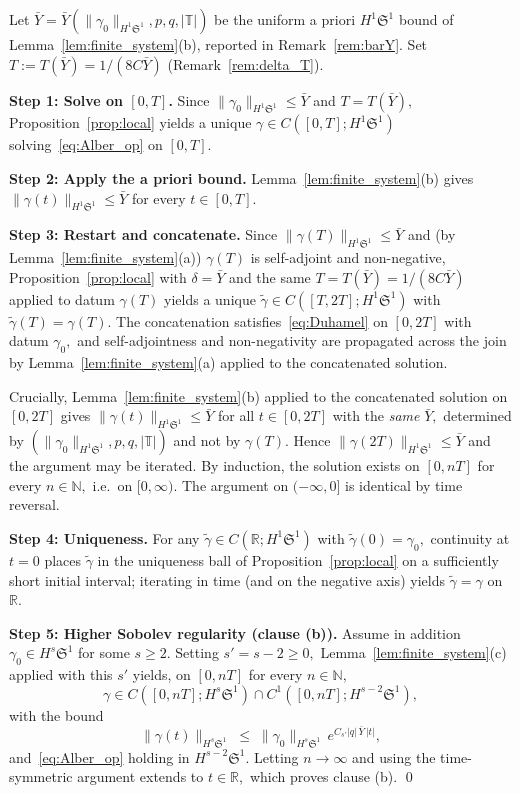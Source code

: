 \documentclass[11pt]{amsart}
\theoremstyle{definition}
\newcommand{\R}{\mathbb{R}}
\newcommand{\T}{\mathbb{T}}
\newcommand{\Sp}{\mathfrak{S}}
\begin{document}
\medskip

\noindent Let $\bar Y=\bar Y(\|\gamma_0\|_{H^1\Sp^1},p,q,|\T|)$ be the uniform a priori $H^1\Sp^1$ bound of Lemma~\ref{lem:finite_system}(b), reported in Remark~\ref{rem:barY}. Set $T:=T(\bar Y)=1/(8C\bar Y)$ (Remark~\ref{rem:delta_T}).

\medskip

\noindent\textbf{Step 1: Solve on $[0,T]$.} Since $\|\gamma_0\|_{H^1\Sp^1}\le\bar Y$ and $T=T(\bar Y),$ Proposition~\ref{prop:local} yields a unique $\gamma\in C([0,T];H^1\Sp^1)$ solving~\eqref{eq:Alber_op} on $[0,T].$

\medskip

\noindent\textbf{Step 2: Apply the a priori bound.} Lemma~\ref{lem:finite_system}(b) gives $\|\gamma(t)\|_{H^1\Sp^1}\le\bar Y$ for every $t\in[0,T].$

\medskip

\noindent\textbf{Step 3: Restart and concatenate.} Since $\|\gamma(T)\|_{H^1\Sp^1}\le\bar Y$ and (by Lemma~\ref{lem:finite_system}(a)) $\gamma(T)$ is self-adjoint and non-negative, Proposition~\ref{prop:local} with $\delta=\bar Y$ and the same $T=T(\bar Y)=1/(8C\bar Y)$ applied to datum $\gamma(T)$ yields a unique $\tilde\gamma\in C([T,2T];H^1\Sp^1)$ with $\tilde\gamma(T)=\gamma(T).$ The concatenation satisfies~\eqref{eq:Duhamel} on $[0,2T]$ with datum $\gamma_0,$ and self-adjointness and non-negativity are propagated across the join by Lemma~\ref{lem:finite_system}(a) applied to the concatenated solution.

Crucially, Lemma~\ref{lem:finite_system}(b) applied to the concatenated solution on $[0,2T]$ gives $\|\gamma(t)\|_{H^1\Sp^1}\le\bar Y$ for all $t\in[0,2T]$ with the \emph{same} $\bar Y,$ determined by $(\|\gamma_0\|_{H^1\Sp^1},p,q,|\T|)$ and not by $\gamma(T).$ Hence $\|\gamma(2T)\|_{H^1\Sp^1}\le\bar Y$ and the argument may be iterated. By induction, the solution exists on $[0,nT]$ for every $n\in\mathbb{N},$ i.e.\ on $[0,\infty).$ The argument on $(-\infty,0]$ is identical by time reversal.

\medskip

\noindent\textbf{Step 4: Uniqueness.} For any $\tilde\gamma\in C(\R;H^1\Sp^1)$ with $\tilde\gamma(0)=\gamma_0,$ continuity at $t=0$ places $\tilde\gamma$ in the uniqueness ball of Proposition~\ref{prop:local} on a sufficiently short initial interval; iterating in time (and on the negative axis) yields $\tilde\gamma=\gamma$ on $\R.$

\medskip

\noindent\textbf{Step 5: Higher Sobolev regularity (clause (b)).} Assume in addition $\gamma_0\in H^s\Sp^1$ for some $s\ge 2.$ Setting $s'=s-2\ge 0,$ Lemma~\ref{lem:finite_system}(c) applied with this $s'$ yields, on $[0,nT]$ for every $n\in\mathbb{N},$
\[
  \gamma\in C([0,nT];H^s\Sp^1)\cap C^1([0,nT];H^{s-2}\Sp^1),
\]
with the bound
\[
  \|\gamma(t)\|_{H^s\Sp^1}\;\le\;\|\gamma_0\|_{H^s\Sp^1}\,e^{C_{s'}|q|\,\bar Y\,|t|},
\]
and~\eqref{eq:Alber_op} holding in $H^{s-2}\Sp^1.$ Letting $n\to\infty$ and using the time-symmetric argument extends to $t\in\R,$ which proves clause (b).
\qed
\end{document}
